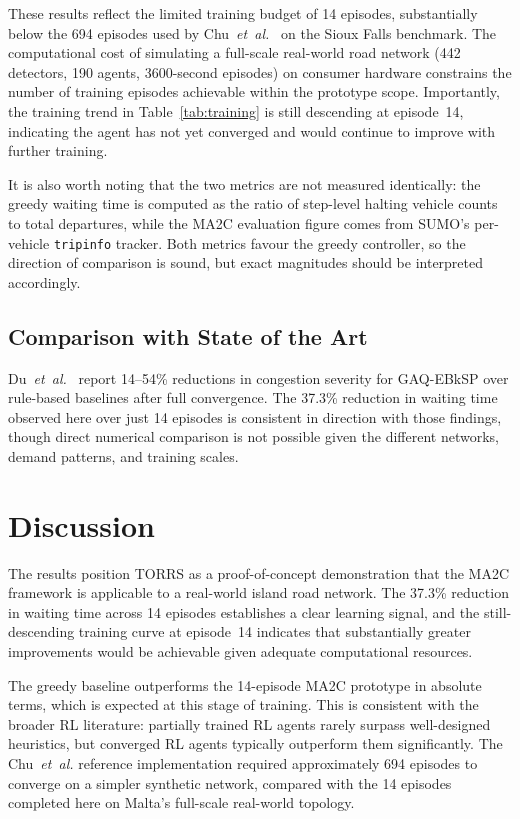\documentclass[conference]{IEEEtran}
\begin{document}
These results reflect the limited training budget of 14 episodes, substantially
below the 694 episodes used by Chu~\textit{et~al.}~\cite{chu2020} on the Sioux
Falls benchmark. The computational cost of simulating a full-scale real-world
road network (442 detectors, 190 agents, 3600-second episodes) on consumer
hardware constrains the number of training episodes achievable within the
prototype scope. Importantly, the training trend in Table~\ref{tab:training} is
still descending at episode~14, indicating the agent has not yet converged and
would continue to improve with further training.

It is also worth noting that the two metrics are not measured identically: the
greedy waiting time is computed as the ratio of step-level halting vehicle counts
to total departures, while the MA2C evaluation figure comes from SUMO's
per-vehicle \texttt{tripinfo} tracker. Both metrics favour the greedy controller,
so the direction of comparison is sound, but exact magnitudes should be
interpreted accordingly.

\subsection{Comparison with State of the Art}

Du~\textit{et~al.}~\cite{du2023} report 14--54\% reductions in congestion
severity for GAQ-EBkSP over rule-based baselines after full convergence. The
37.3\% reduction in waiting time observed here over just 14 episodes is
consistent in direction with those findings, though direct numerical comparison
is not possible given the different networks, demand patterns, and training
scales.

\section{Discussion}

The results position TORRS as a proof-of-concept demonstration that the MA2C
framework is applicable to a real-world island road network. The 37.3\%
reduction in waiting time across 14 episodes establishes a clear learning
signal, and the still-descending training curve at episode~14 indicates that
substantially greater improvements would be achievable given adequate
computational resources.

The greedy baseline outperforms the 14-episode MA2C prototype in absolute terms,
which is expected at this stage of training. This is consistent with the broader
RL literature: partially trained RL agents rarely surpass well-designed
heuristics, but converged RL agents typically outperform them significantly. The
Chu~\textit{et~al.} reference implementation required approximately 694 episodes
to converge on a simpler synthetic network, compared with the 14 episodes
completed here on Malta's full-scale real-world topology.
\end{document}
